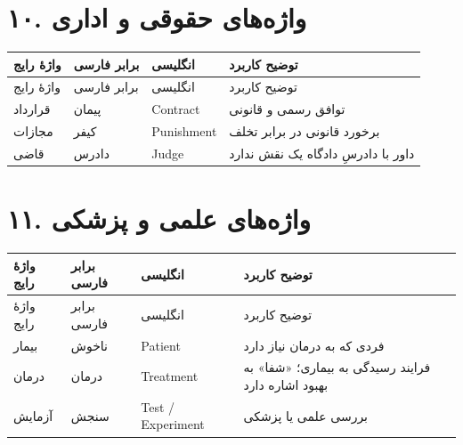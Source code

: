 \documentclass[a4paper,12pt,openany]{book}
\begin{document}
\section*{۱۰. واژه‌های حقوقی و اداری}
\begingroup
\small
\setlength{\tabcolsep}{4pt}
\renewcommand{\arraystretch}{1.25}
\begin{longtable}{|p{2.5cm}|p{4.0cm}|p{2.3cm}|p{5.3cm}|}
\hline
واژهٔ رایج & برابر فارسی & انگلیسی & توضیح کاربرد \\
\hline
\endfirsthead
\hline
واژهٔ رایج & برابر فارسی & انگلیسی & توضیح کاربرد \\
\hline
\endhead
قرارداد & پیمان & \textenglish{Contract} & توافق رسمی و قانونی \\
مجازات & کیفر & \textenglish{Punishment} & برخورد قانونی در برابر تخلف \\
قاضی & دادرس & \textenglish{Judge} & داور با دادرسِ دادگاه یک نقش ندارد \\
\hline
\end{longtable}
\endgroup

\section*{۱۱. واژه‌های علمی و پزشکی}
\begingroup
\small
\setlength{\tabcolsep}{4pt}
\renewcommand{\arraystretch}{1.25}
\begin{longtable}{|p{2.5cm}|p{4.0cm}|p{2.3cm}|p{5.3cm}|}
\hline
واژهٔ رایج & برابر فارسی & انگلیسی & توضیح کاربرد \\
\hline
\endfirsthead
\hline
واژهٔ رایج & برابر فارسی & انگلیسی & توضیح کاربرد \\
\hline
\endhead
بیمار & ناخوش & \textenglish{Patient} & فردی که به درمان نیاز دارد \\
درمان & درمان & \textenglish{Treatment} & فرایند رسیدگی به بیماری؛ «شفا» به بهبود اشاره دارد \\
آزمایش & سنجش & \textenglish{Test / Experiment} & بررسی علمی یا پزشکی \\
\hline
\end{longtable}
\endgroup
\end{document}
